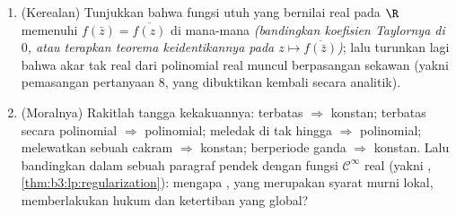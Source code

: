 \begin{problem}
\begin{enumerate}[resume]
{        genap)}. Bilangan ini akan menghargai setiap $\zeta(2k)$ di
        \cref{ch:b3:residues}.
  \item (Kerealan) Tunjukkan bahwa fungsi utuh yang bernilai real
        pada $\R$ memenuhi $f(\bar z) =
        \overline{f(z)}$ di mana-mana \emph{(bandingkan koefisien
        Taylornya di $0$, atau terapkan teorema keidentikannya
        pada $z \mapsto \overline{f(\bar z)}$)}; lalu turunkan lagi
        bahwa akar tak real dari polinomial real muncul berpasangan
        sekawan (yakni pemasangan pertanyaan 8, yang dibuktikan kembali
        secara analitik).
  \item (Moralnya) Rakitlah tangga kekakuannya: terbatas
        $\Rightarrow$ konstan; terbatas secara polinomial
        $\Rightarrow$ polinomial; meledak di tak hingga $\Rightarrow$
        polinomial; melewatkan sebuah cakram $\Rightarrow$ konstan;
        berperiode ganda $\Rightarrow$ konstan. Lalu bandingkan dalam
        sebuah paragraf pendek dengan fungsi $\mathcal C^\infty$ real
        (yakni ,
        \cref{thm:b3:lp:regularization}): mengapa ,
        yang merupakan syarat murni lokal, memberlakukan hukum dan
        ketertiban yang global?
\end{enumerate}


\end{problem}
